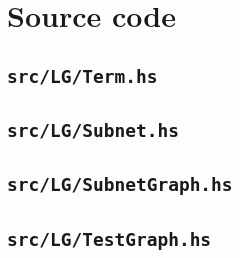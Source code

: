 \documentclass[12pt,a4paper]{article}
\begin{document}
\appendix

\section{Source code}\label{code}

\subsection{\texttt{src/LG/Term.hs}}\label{code:term}

\subsection{\texttt{src/LG/Subnet.hs}}\label{code:net}

\subsection{\texttt{src/LG/SubnetGraph.hs}}\label{code:netgraph}

\subsection{\texttt{src/LG/TestGraph.hs}}\label{code:test}
\end{document}
